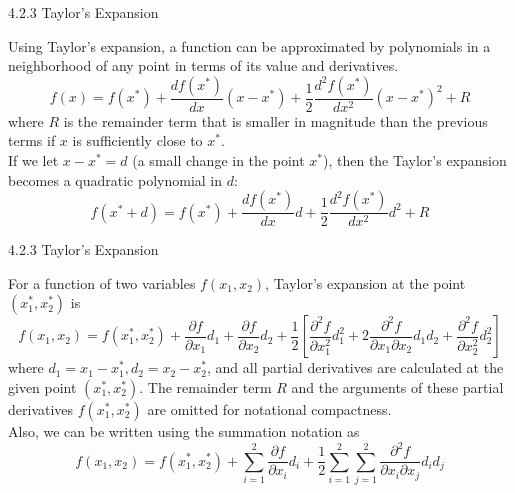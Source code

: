 \documentclass[aspectratio=169,xcolor=dvipsnames]{beamer}
\begin{document}
\begin{frame}{4.2.3 Taylor's Expansion}

Using Taylor's expansion, a function can be approximated by polynomials in a neighborhood of any point in terms of its value and derivatives.
\begin{equation*}
    f(x) = f(x^*) + \frac{df(x^*)}{dx}(x - x^*) + \frac{1}{2}\frac{d^2 f(x^*)}{dx^2}(x - x^*)^2 + R
\end{equation*}
where $R$ is the remainder term that is smaller in magnitude than the previous terms if $x$ is sufficiently close to $x^*$. \\
If we let $x - x^* = d$ (a small change in the point $x^*$), then the Taylor's expansion becomes a quadratic polynomial in $d$:
\begin{equation*}
    f(x^* + d) = f(x^*) + \frac{df(x^*)}{dx} d + \frac{1}{2} \frac{d^2 f(x^*)}{dx^2} d^2 + R
\end{equation*}

\end{frame}

\begin{frame}{4.2.3 Taylor's Expansion}

For a function of two variables $f(x_1, x_2)$, Taylor's expansion at the point $(x^*_1, x^*_2)$ is 
\begin{equation*}
    f(x_1, x_2) = f(x^*_1, x^*_2) + \frac{\partial f}{\partial x_1} d_1 + \frac{\partial f}{\partial x_2} d_2 + \frac{1}{2} \left[ \frac{\partial^2 f}{\partial x^2_1} d^2_1 + 2 \frac{\partial^2 f}{\partial x_1 \partial x_2} d_1 d_2 + \frac{\partial^2 f}{\partial x^2_2} d^2_2 \right]
\end{equation*}
where $d_1 = x_1 - x^*_1, d_2 = x_2 - x^*_2$, and all partial derivatives are calculated at the given point $(x^*_1, x^*_2)$.
The remainder term $R$ and the arguments of these partial derivatives $f(x^*_1, x^*_2)$ are omitted for notational compactness. \\
Also, we can be written using the summation notation as
\begin{equation*}
    f(x_1, x_2) = f(x^*_1, x^*_2) + \sum^2_{i = 1} \frac{\partial f}{\partial x_i} d_i + \frac{1}{2} \sum^2_{i = 1} \sum^2_{j = 1} \frac{\partial^2 f}{\partial x_i \partial x_j} d_i d_j
\end{equation*}

\end{frame}
\end{document}

